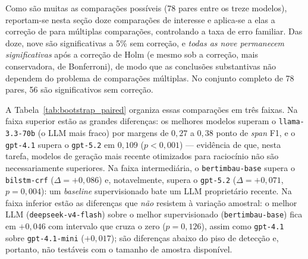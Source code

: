 Como são muitas as comparações possíveis (78 pares entre os treze modelos), reportam-se nesta seção doze comparações de interesse e aplica-se a elas a correção de  para múltiplas comparações, controlando a taxa de erro familiar. Das doze, nove são significativas a 5\% sem correção, e \emph{todas as nove permanecem significativas} após a correção de Holm (e mesmo sob a correção, mais conservadora, de Bonferroni), de modo que as conclusões substantivas não dependem do problema de comparações múltiplas. No conjunto completo de 78 pares, 56 são significativos sem correção.

A Tabela~\ref{tab:bootstrap_paired} organiza essas comparações em três faixas. Na faixa superior estão as grandes diferenças: os melhores modelos superam o \texttt{llama-3.3-70b} (o LLM mais fraco) por margens de $0{,}27$ a $0{,}38$ ponto de \textit{span} F1, e o \texttt{gpt-4.1} supera o \texttt{gpt-5.2} em $0{,}109$ ($p < 0{,}001$) --- evidência de que, nesta tarefa, modelos de geração mais recente otimizados para raciocínio não são necessariamente superiores. Na faixa intermediária, o \texttt{bertimbau-base} supera o \texttt{bilstm-crf} ($\Delta = +0{,}086$) e, notavelmente, supera o \texttt{gpt-5.2} ($\Delta = +0{,}071$, $p = 0{,}004$): um \textit{baseline} supervisionado bate um LLM proprietário recente. Na faixa inferior estão as diferenças que \emph{não} resistem à variação amostral: o melhor LLM (\texttt{deepseek-v4-flash}) sobre o melhor supervisionado (\texttt{bertimbau-base}) fica em $+0{,}046$ com intervalo que cruza o zero ($p = 0{,}126$), assim como \texttt{gpt-4.1} sobre \texttt{gpt-4.1-mini} ($+0{,}017$); são diferenças abaixo do piso de detecção e, portanto, não testáveis com o tamanho de amostra disponível.

